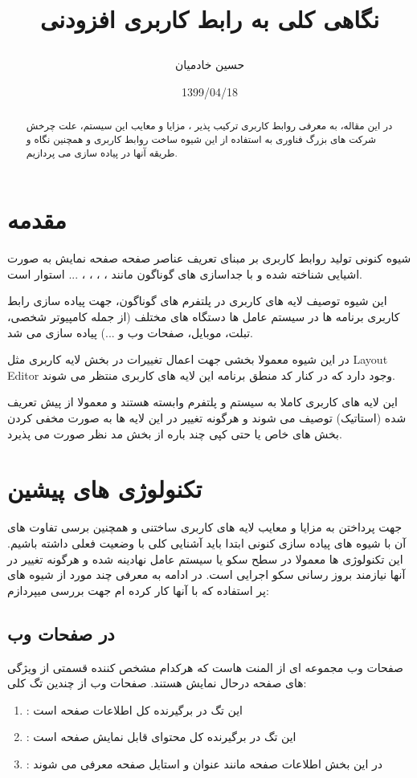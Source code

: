\documentclass{CSICC2020}
\title{
\lr{Overview on Composable UI}

نگاهی کلی به رابط کاربری افزودنی
}
\date{1399/04/18}
\author[1]{حسین خادمیان}
\affil[1]{
دانشجوی کارشناسی، مهندسی کامپیوتر، دانشگاه شیراز ، شیراز،
me@hkhademian.ir
}
\begin{document}
\maketitle
\begin{abstract}
در این مقاله، به معرفی روابط کاربری ترکیب پذیر ، مزایا و معایب این سیستم، علت چرخش شرکت های بزرگ فناوری به استفاده از این شیوه ساخت روابط کاربری و همچنین نگاه و طریقه آنها در پیاده سازی می پردازیم.
\end{abstract}
\begin{keywords}
\end{keywords}

\section{مقدمه}
شیوه کنونی تولید روابط کاربری بر مبنای تعریف عناصر صفحه صفحه نمایش به صورت اشیایی شناخته شده و با جداسازی  های گوناگون مانند ، ، ، ، ... استوار است.

این شیوه توصیف لایه های کاربری در پلتفرم های گوناگون، جهت پیاده سازی رابط کاربری برنامه ها در سیستم عامل ها دستگاه های مختلف (از جمله کامپیوتر شخصی، تبلت، موبایل، صفحات وب و ...) پیاده سازی می شد.

در این شیوه معمولا بخشی جهت اعمال تغییرات در بخش لایه کاربری مثل Layout Editor وجود دارد که در کنار کد منطق برنامه این لایه های کاربری منتظر می شوند.

این لایه های کاربری کاملا به سیستم و پلتفرم وابسته هستند و معمولا از پیش تعریف شده (استاتیک) توصیف می شوند و هرگونه تغییر در این لایه ها به صورت مخفی کردن بخش های خاص یا حتی کپی چند باره از بخش مد نظر صورت می پذیرد.

\section{تکنولوژی های پیشین}
\label{History}
جهت پرداختن به مزایا و معایب لایه های کاربری ساختنی و همچنین برسی تفاوت های آن با شیوه های پیاده سازی کنونی ابتدا باید آشنایی کلی با وضعیت فعلی داشته باشیم.
این تکنولوژی ها معمولا در سطح سکو یا سیستم عامل نهادینه شده و هرگونه تغییر در آنها نیازمند بروز رسانی سکو اجرایی است.
در ادامه به معرفی چند مورد از شیوه های پر استفاده که با آنها کار کرده ام جهت بررسی میپردازم:

\subsection{ در صفحات وب}
\label{HTML}
صفحات وب مجموعه ای از المنت هاست \cite{htmlwiki} که هرکدام مشخص کننده قسمتی از ویژگی های صفحه درحال نمایش هستند. صفحات وب از چندین تگ کلی:
\begin{enumerate} 
\item {}: این تگ در برگیرنده کل اطلاعات صفحه است
\item {}: این تگ در برگیرنده کل محتوای قابل نمایش صفحه است
\item {}: در این بخش اطلاعات صفحه مانند عنوان و استایل صفحه معرفی می شوند
\end{enumerate} 
\end{document}
